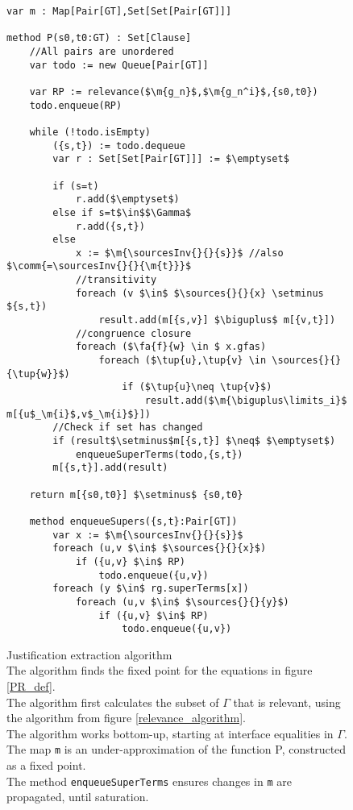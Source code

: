 \begin{figure}
\begin{lstlisting}
var m : Map[Pair[GT],Set[Set[Pair[GT]]]

method P(s0,t0:GT) : Set[Clause]
	//All pairs are unordered
	var todo := new Queue[Pair[GT]]
	
	var RP := relevance($\m{g_n}$,$\m{g_n^i}$,{s0,t0})
	todo.enqueue(RP)
	
	while (!todo.isEmpty)
		({s,t}) := todo.dequeue
		var r : Set[Set[Pair[GT]]] := $\emptyset$

		if (s=t)
			r.add($\emptyset$)
		else if s=t$\in$$\Gamma$
			r.add({s,t})
		else
			x := $\m{\sourcesInv{}{}{s}}$ //also $\comm{=\sourcesInv{}{}{\m{t}}}$
			//transitivity
			foreach (v $\in$ $\sources{}{}{x} \setminus ${s,t})
				result.add(m[{s,v}] $\biguplus$ m[{v,t}])
			//congruence closure
			foreach ($\fa{f}{w} \in $ x.gfas)
				foreach ($\tup{u},\tup{v} \in \sources{}{}{\tup{w}}$)
					if ($\tup{u}\neq \tup{v}$)
						result.add($\m{\biguplus\limits_i}$ m[{u$_\m{i}$,v$_\m{i}$}])
		//Check if set has changed
		if (result$\setminus$m[{s,t}] $\neq$ $\emptyset$)
			enqueueSuperTerms(todo,{s,t})
		m[{s,t}].add(result)

	return m[{s0,t0}] $\setminus$ {s0,t0}
	
	method enqueueSupers({s,t}:Pair[GT])
		var x := $\m{\sourcesInv{}{}{s}}$
		foreach (u,v $\in$ $\sources{}{}{x}$)
			if ({u,v} $\in$ RP)
				todo.enqueue({u,v})
		foreach (y $\in$ rg.superTerms[x])
			foreach (u,v $\in$ $\sources{}{}{y}$)
				if ({u,v} $\in$ RP)
					todo.enqueue({u,v})
\end{lstlisting}
\caption{Justification extraction algorithm\\
The algorithm finds the fixed point for the equations in figure \ref{PR_def}.\\
The algorithm first calculates the subset of $\Gamma$ that is relevant, using the algorithm from figure \ref{relevance_algorithm}.\\
The algorithm works bottom-up, starting at interface equalities in $\Gamma$.\\
The map \lstinline|m| is an under-approximation of the function P, constructed as a fixed point.\\
The method \lstinline |enqueueSuperTerms| ensures changes in \lstinline|m| are propagated, until saturation.
}
\label{PR_algorithm}
\end{figure}


